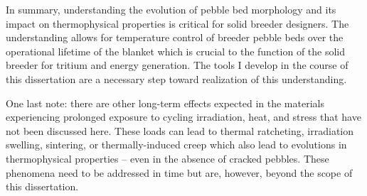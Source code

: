 In summary, understanding the evolution of pebble bed morphology and its impact on thermophysical properties is critical for solid breeder designers. The understanding allows for temperature control of breeder pebble beds over the operational lifetime of the blanket which is crucial to the function of the solid breeder for tritium and energy generation. The tools I develop in the course of this dissertation are a necessary step toward realization of this understanding. 

One last note: there are other long-term effects expected in the materials experiencing prolonged exposure to cycling irradiation, heat, and stress that have not been discussed here. These loads can lead to thermal ratcheting, irradiation swelling, sintering, or thermally-induced creep which also lead to evolutions in thermophysical properties -- even in the absence of cracked pebbles. These phenomena need to be addressed in time but are, however, beyond the scope of this dissertation. 


